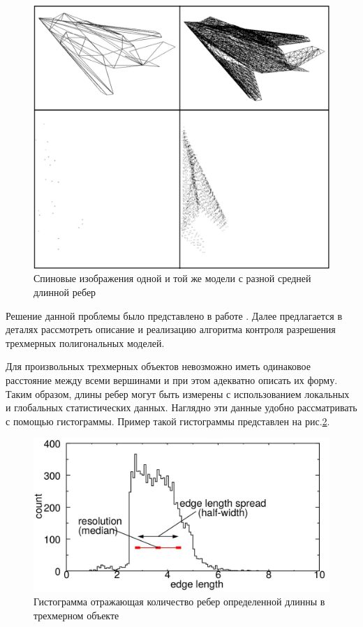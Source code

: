 \documentclass[14pt]{article}
\numberwithin{figure}{section}
\numberwithin{equation}{section}
\begin{document}
\begin{figure}[h]
	\begin{center}
		\includegraphics[scale=0.3]{5.JPG}
		\caption{Спиновые изображения одной и той же модели с разной средней длинной ребер}
		\label{ris:5}
	\end{center}
\end{figure}

Решение данной проблемы было представлено в работе \cite{Spin}. Далее предлагается в деталях рассмотреть описание и реализацию алгоритма контроля разрешения трехмерных полигональных моделей.

Для произвольных трехмерных объектов невозможно иметь одинаковое расстояние между всеми вершинами и при этом адекватно описать их форму. Таким образом, длины ребер могут быть измерены с использованием локальных и глобальных статистических данных. Наглядно эти данные удобно рассматривать с помощью гистограммы. Пример такой гистограммы представлен на рис.\ref{ris:mc1}.

\begin{figure}
	\begin{center}
		\includegraphics[scale = 0.6]{mc1.JPG}
		\caption{Гистограмма отражающая количество ребер определенной длинны в трехмерном объекте}
		\label{ris:mc1}
	\end{center}
\end{figure}
\end{document}
